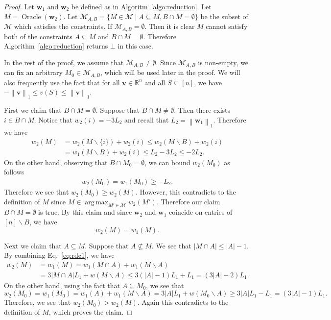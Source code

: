 \documentclass{article}
\newcommand{\M}{\mathcal M}
\newcommand{\del}{\backslash}
\newcommand{\RR}{\mathbb R}
\DeclareMathOperator*{\argmax}{arg\,max}
\DeclareMathOperator{\Oracle}{Oracle}
\newcommand{\nor}[1]{\left\|#1\right\|}
\renewcommand{\vec}[1]{\boldsymbol{#1}}
\begin{document}
\begin{proof}
Let $\vec w_1$ and $\vec w_2$ be defined as in Algoritm~\ref{algo:reduction}.
Let $M=\Oracle(\vec w_2)$.
Let $\M_{A,B} = \{M\in \M \mid A\subseteq M, B\cap M =\emptyset \}$ be the subset of $\M$ which satisfies the constraints.
If $\M_{A,B} = \emptyset$. 
Then it is clear $M$ cannot satisfy both of the constraints $A \subseteq M$ and $B \cap M =\emptyset$. 
Therefore Algorithm~\ref{algo:reduction} returns $\bot$ in this case.

In the rest of the proof, we assume that $\M_{A,B} \not=\emptyset$. 
Since $\M_{A,B}$ is non-empty, we can fix an arbitrary $M_0 \in \M_{A,B}$, which will be used later in the proof. 
We will also frequently use the fact that for all $\vec v\in \RR^{n}$ and all $S\subseteq[n]$, we have $-\nor{\vec v}_1 \le v(S) \le \nor{\vec v}_1$.

First we claim that $B\cap M =\emptyset$.
Suppose that $B\cap M\not=\emptyset$. 
Then there exists $i\in B \cap M$.
Notice that $w_2(i) = -3L_2$ and recall that $L_2=\nor{\vec w_1}_1$.
Therefore we have
\begin{align*}
w_2(M) &= w_2(M\del \{i\})+w_2(i) \le w_2(M\del B)+w_2(i) \\
       &= w_1(M\del B)+w_2(i) \le L_2-3L_2 \le -2L_2.
\end{align*}
On the other hand, observing that $B\cap M_0=\emptyset$, we can bound $w_2(M_0)$ as follows
\begin{align*}
w_2(M_0) = w_1(M_0) \ge -L_2.
\end{align*}
Therefore we see that $w_2(M_0) \ge w_2(M)$.
However, this contradicts to the definition of $M$ since $M \in \argmax_{M'\in \M} w_2(M')$.
Therefore our claim $B\cap M = \emptyset$ is true.
By this claim and since $\vec w_2$ and $\vec w_1$ coincide on entries of $[n]\del B$, we have
\begin{equation}
\label{eq:rdc1}
w_2(M) = w_1(M).
\end{equation}

Next we claim that $A \subseteq M$. Suppose that $A\not\subseteq M$. 
We see that $|M\cap A| \le |A|-1$.
By combining Eq.~\eqref{eq:rdc1}, we have
\begin{align*}
w_2(M) &= w_1(M) = w_1(M\cap A)+w_1(M\del A) \\
       &= 3|M\cap A| L_1 + w(M\del A) \le 3(|A|-1) L_1+ L_1 = (3|A|-2)L_1.
\end{align*}
On the other hand, using the fact that $A\subseteq M_0$, we see that
$$
w_2(M_0) = w_1(M_0) = w_1(A)+w_1(M\del A) = 3|A| L_1+w(M_0\del A) \ge 3|A| L_1-L_1 = (3|A|-1)L_1.
$$
Therefore, we see that $w_2(M_0) > w_2(M)$. 
Again this contradicts to the definition of $M$, which proves the claim.



\end{proof}
\end{document}
